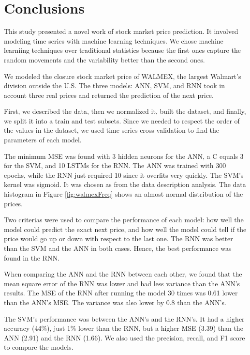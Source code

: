\chapter{Conclusions}
\label{ch:conclusions}

This study presented a novel work of stock market price prediction. It involved modeling time series with machine learning techniques. We chose machine learniing techniques over traditional statistics because the first ones capture the random movements and the variability better than the second ones. 


We modeled the closure stock market price of WALMEX, the largest Walmart's division outside the U.S. The three models: ANN, SVM, and RNN took in account three real prices and returned the prediction of the next price.

First, we described the data, then we normalized it, built the dataset, and finally, we split it into a train and test subsets. Since we needed to respect the order of the values in the dataset, we used time series cross-validation to find the parameters of each model.

The minimum MSE was found with 3 hidden neurons for the ANN, a C equals 3 for the SVM, and 10 LSTMs for the RNN. The ANN was trained with 300 epochs, while the RNN just required 10 since it overfits very quickly. The SVM's kernel was sigmoid. It was chosen as from the data description analysis. The data histogram in Figure \ref{fig:walmexFreq} shows an almost normal distribution of the prices. 

Two criterias were used to compare the performance of each model: how well the model could predict the exact next price, and how well the model could tell if the price would go up or down with respect to the last one. The RNN was better than the SVM and the ANN in both cases. Hence, the best performance was found in the RNN.

When comparing the ANN and the RNN between each other, we found that the mean square error of the RNN was lower and had less variance than the ANN's results. The MSE of the RNN after running the model 30 times was 0.61 lower than the ANN's MSE. The variance was also lower by 0.8 than the ANN's.

The SVM's performance was between the ANN's and the RNN's. It had a higher accuracy (44\%), just 1\% lower than the RNN, but a higher MSE (3.39) than the ANN (2.91) and the RNN (1.66). We also used the precision, recall, and F1 score to compare the models. 

